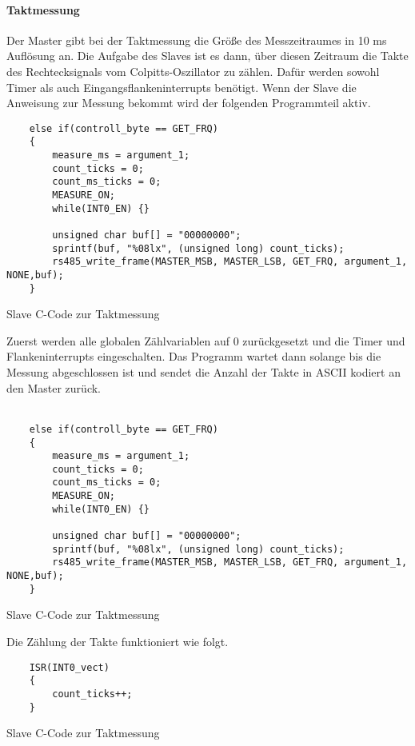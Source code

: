 \paragraph{Taktmessung}\mbox{} 

Der Master gibt bei der Taktmessung die Größe des Messzeitraumes in 10 \si{\milli\second} Auflösung an.
Die Aufgabe des Slaves ist es dann, über diesen Zeitraum die Takte des Rechtecksignals vom
Colpitts-Oszillator zu zählen. Dafür werden sowohl Timer als auch Eingangsflankeninterrupts
benötigt. Wenn der Slave die Anweisung zur Messung bekommt wird der folgenden Programmteil
aktiv.
\begin{listing}[H]
    \begin{verbatim}
    else if(controll_byte == GET_FRQ)
    {
        measure_ms = argument_1;
        count_ticks = 0;
        count_ms_ticks = 0;
        MEASURE_ON;
        while(INT0_EN) {}
    
        unsigned char buf[] = "00000000";
        sprintf(buf, "%08lx", (unsigned long) count_ticks);
        rs485_write_frame(MASTER_MSB, MASTER_LSB, GET_FRQ, argument_1, NONE,buf);
    } 
    \end{verbatim}
    \caption{ Slave C-Code zur Taktmessung}
\end{listing}


Zuerst werden alle globalen Zählvariablen auf 0 zurückgesetzt und die Timer und Flankeninterrupts
eingeschalten. Das Programm wartet dann solange bis die Messung abgeschlossen ist und sendet
die Anzahl der Takte in ASCII kodiert an den Master zurück. 
\\ \\
\begin{listing}[H]
    \begin{verbatim}
    else if(controll_byte == GET_FRQ)
    {
        measure_ms = argument_1;
        count_ticks = 0;
        count_ms_ticks = 0;
        MEASURE_ON;
        while(INT0_EN) {}
    
        unsigned char buf[] = "00000000";
        sprintf(buf, "%08lx", (unsigned long) count_ticks);
        rs485_write_frame(MASTER_MSB, MASTER_LSB, GET_FRQ, argument_1, NONE,buf);
    } 
    \end{verbatim}
    \caption{ Slave C-Code zur Taktmessung}
\end{listing}
Die Zählung der Takte funktioniert wie folgt.
\begin{listing}[H]
    \begin{verbatim}
    ISR(INT0_vect)
    {
        count_ticks++;
    }
    \end{verbatim}
    \caption{ Slave C-Code zur Taktmessung}
\end{listing}


